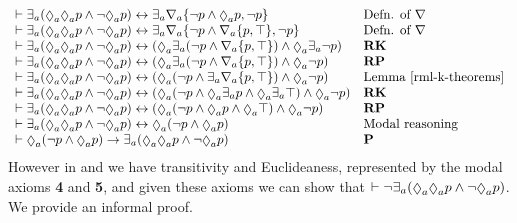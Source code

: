 $$
\begin{array}{ll}
    \proves \somerefsA (\possibleA \possibleA \atomP \land \lnot \possibleA \atomP) \iff \somerefsA \coversA \{\lnot \atomP \land \possibleA \atomP, \lnot \atomP\} & \text{Defn. of $\covers$}\\
    \proves \somerefsA (\possibleA \possibleA \atomP \land \lnot \possibleA \atomP) \iff \somerefsA \coversA \{\lnot \atomP \land \coversA \{\atomP, \top\}, \lnot \atomP\} & \text{Defn. of $\covers$}\\
    \proves \somerefsA (\possibleA \possibleA \atomP \land \lnot \possibleA \atomP) \iff (\possibleA \somerefsA (\lnot \atomP \land \coversA \{\atomP, \top\}) \land \possibleA \somerefsA \lnot \atomP)& {\bf RK}\\
    \proves \somerefsA (\possibleA \possibleA \atomP \land \lnot \possibleA \atomP) \iff (\possibleA \somerefsA (\lnot \atomP \land \coversA \{\atomP, \top\}) \land \possibleA \lnot \atomP)& {\bf RP}\\
    \proves \somerefsA (\possibleA \possibleA \atomP \land \lnot \possibleA \atomP) \iff (\possibleA (\lnot \atomP \land \somerefsA \coversA \{\atomP, \top\}) \land \possibleA \lnot \atomP)& \text{Lemma~\ref{rml-k-theorems}}\\
    \proves \somerefsA (\possibleA \possibleA \atomP \land \lnot \possibleA \atomP) \iff (\possibleA (\lnot \atomP \land \possibleA \somerefsA \atomP \land \possibleA \somerefsA \top) \land \possibleA \lnot \atomP)& {\bf RK}\\
    \proves \somerefsA (\possibleA \possibleA \atomP \land \lnot \possibleA \atomP) \iff (\possibleA (\lnot \atomP \land \possibleA \atomP \land \possibleA \top) \land \possibleA \lnot \atomP)& {\bf RP}\\
    \proves \somerefsA (\possibleA \possibleA \atomP \land \lnot \possibleA \atomP) \iff \possibleA (\lnot \atomP \land \possibleA \atomP)& \text{Modal reasoning}\\
    \proves \possibleA (\lnot \atomP \land \possibleA \atomP) \implies \somerefsA (\possibleA \possibleA \atomP \land \lnot \possibleA \atomP) & {\bf P}
\end{array}
$$
However in \logicRmlKFF{} and \logicRmlKD{} we have transitivity and Euclideaness, represented by the modal axioms {\bf 4} and {\bf 5}, and given these axioms we can show that $\proves \lnot \somerefsA (\possibleA \possibleA \atomP \land \lnot \possibleA \atomP)$.
We provide an informal proof.
